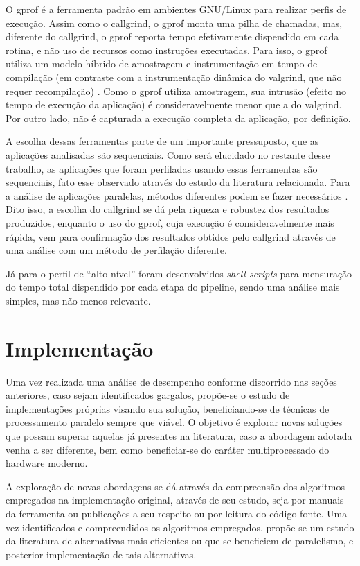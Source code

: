 \documentclass[cic,tc]{iiufrgs}
\begin{document}
O gprof é a ferramenta padrão em ambientes GNU/Linux para realizar perfis de
execução. Assim como o callgrind, o gprof monta uma pilha de chamadas, mas,
diferente do callgrind, o gprof reporta tempo efetivamente dispendido em cada
rotina, e não uso de recursos como instruções executadas. Para isso, o gprof
utiliza um modelo híbrido de amostragem e instrumentação em tempo de compilação
(em contraste com a instrumentação dinâmica do valgrind, que não requer
recompilação) \cite{graham1982gprof}. Como o gprof utiliza amostragem, sua
intrusão (efeito no tempo de execução da aplicação) é consideravelmente menor
que a do valgrind. Por outro lado, não é capturada a execução completa da
aplicação, por definição.

A escolha dessas ferramentas parte de um importante pressuposto, que as
aplicações analisadas são sequenciais. Como será elucidado no restante desse
trabalho, as aplicações que foram perfiladas usando essas ferramentas são
sequenciais, fato esse observado através do estudo da literatura relacionada.
Para a análise de aplicações paralelas, métodos diferentes podem se fazer
necessários \cite{weidendorfer2008sequential}. Dito isso, a escolha do callgrind
se dá pela riqueza e robustez dos resultados produzidos, enquanto o uso do
gprof, cuja execução é consideravelmente mais rápida, vem para confirmação dos
resultados obtidos pelo callgrind através de uma análise com um método de
perfilação diferente.

Já para o perfil de ``alto nível'' foram desenvolvidos \textit{shell scripts}
para mensuração do tempo total dispendido por cada etapa do pipeline, sendo uma
análise mais simples, mas não menos relevante.

\section{Implementação}

Uma vez realizada uma análise de desempenho conforme discorrido nas seções
anteriores, caso sejam identificados gargalos, propõe-se o estudo de
implementações próprias visando sua solução, beneficiando-se de técnicas de
processamento paralelo sempre que viável. O objetivo é explorar novas soluções
que possam superar aquelas já presentes na literatura, caso a abordagem adotada
venha a ser diferente, bem como beneficiar-se do caráter multiprocessado do
hardware moderno.

A exploração de novas abordagens se dá através da compreensão dos algoritmos
empregados na implementação original, através de seu estudo, seja por manuais
da ferramenta ou publicações a seu respeito ou por leitura do código fonte. Uma
vez identificados e compreendidos os algoritmos empregados, propõe-se um estudo
da literatura de alternativas mais eficientes ou que se beneficiem de
paralelismo, e posterior implementação de tais alternativas.
\end{document}
